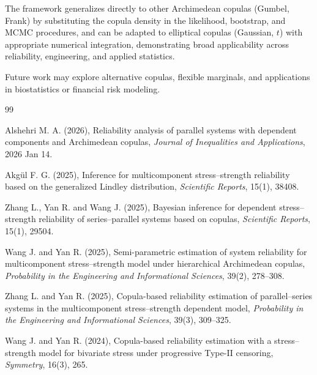 \documentclass[twoside]{article}
\begin{document}
The framework generalizes directly to other Archimedean copulas (Gumbel, Frank) by substituting the copula density in the likelihood, bootstrap, and MCMC procedures, and can be adapted to elliptical copulas (Gaussian, $t$) with appropriate numerical integration, demonstrating broad applicability across reliability, engineering, and applied statistics.

Future work may explore alternative copulas, flexible marginals, and applications in biostatistics or financial risk modeling.



\begin{thebibliography}{99}
	
	Alshehri M. A. (2026), Reliability analysis of parallel systems with dependent components and Archimedean copulas, {\it Journal of Inequalities and Applications}, 2026 Jan 14.
	
	Akg\"{u}l F. G. (2025), Inference for multicomponent stress--strength reliability based on the generalized Lindley distribution, {\it Scientific Reports}, 15(1), 38408.
	
	Zhang L., Yan R. and Wang J. (2025), Bayesian inference for dependent stress--strength reliability of series--parallel systems based on copulas, {\it Scientific Reports}, 15(1), 29504.
	
	Wang J. and Yan R. (2025), Semi-parametric estimation of system reliability for multicomponent stress--strength model under hierarchical Archimedean copulas, {\it Probability in the Engineering and Informational Sciences}, 39(2), 278--308.
	
	Zhang L. and Yan R. (2025), Copula-based reliability estimation of parallel--series systems in the multicomponent stress--strength dependent model, {\it Probability in the Engineering and Informational Sciences}, 39(3), 309--325.
	
	Wang J. and Yan R. (2024), Copula-based reliability estimation with a stress--strength model for bivariate stress under progressive Type-II censoring, {\it Symmetry}, 16(3), 265.
	

\end{thebibliography}
\end{document}
